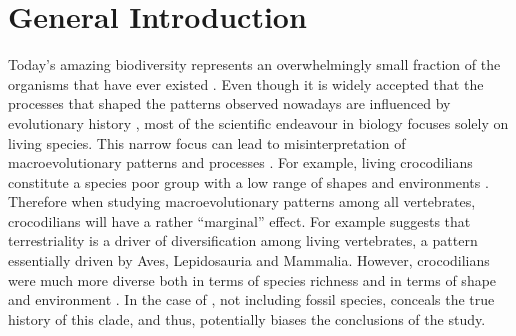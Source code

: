 \chapter{General Introduction}
\label{chap:introduction}



%
% 

Today's amazing biodiversity represents an overwhelmingly small fraction of the organisms that have ever existed \citep{novacek1992ext,raup1993extinction}.
Even though it is widely accepted that the processes that shaped the patterns observed nowadays are influenced by evolutionary history \citep{fritzdiversity2013}, most of the scientific endeavour in biology focuses solely on living species.
This narrow focus can lead to misinterpretation of macroevolutionary patterns and processes \citep{benton2015}.
For example, living crocodilians constitute a species poor group \citep[25 species;][]{uetz2010original} with a low range of shapes and environments \citep[marine or freshwater;][]{Martin2008}.
Therefore when studying macroevolutionary patterns among all vertebrates, crocodilians will have a rather ``marginal'' effect.
For example \cite{Wiens2015} suggests that terrestriality is a driver of diversification among living vertebrates, a pattern essentially driven by Aves, Lepidosauria and Mammalia.
However, crocodilians were much more diverse both in terms of species richness \citep[244 species reported in][]{Bronzati2015} and in terms of shape and environment \citep{stubbs2013}.
In the case of \cite{Wiens2015}, not including fossil species, conceals the true history of this clade, and thus, potentially biases the conclusions of the study.

